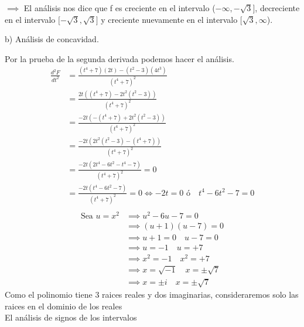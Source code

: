 $\implies$ El análisis nos dice que f es creciente en el intervalo ($-\infty,-\sqrt{3}\big]$, decreciente en el intervalo $[-\sqrt{3},\sqrt{3}\big]$ y creciente nuevamente en el intervalo $[\sqrt{3},\infty$).

				b) Análisis de concavidad.

				Por la prueba de la segunda derivada podemos hacer el análisis.
				\begin{align*}
					\frac{d^2F}{dt^2} & =\frac{(t^4+7)(2t)-(t^2-3)(4t^3)}{(t^4+7)^2}                                   \\
					                  & =\frac{2t((t^4+7)-2t^2(t^2-3))}{(t^4+7)^2}                                     \\
					                  & =\frac{-2t(-(t^4+7)+2t^2(t^2-3))}{(t^4+7)^2}                                   \\
					                  & =\frac{-2t(2t^2(t^2-3)-(t^4+7))}{(t^4+7)^2}                                    \\
					                  & =\frac{-2t(2t^4-6t^2-t^4-7)}{(t^4+7)^2}=0                                      \\
					                  & =\frac{-2t(t^4-6t^2-7)}{(t^4+7)^2}=0 \iff   -2t=0 \text{ ó}\quad t^4-6t^2-7 =0 \\
				\end{align*}
				\begin{align*}
					\text{Sea } u=x^2 & \implies u^2-6u-7=0                     \\
					                  & \implies (u+1)(u-7)=0                   \\
					                  & \implies          u+1=0\quad u-7=0      \\
					                  & \implies u=-1\quad u=+7                 \\
					                  & \implies x^2=-1\quad x^2=+7             \\
					                  & \implies x=\sqrt{-1}\quad x=\pm\sqrt{7} \\
					                  & \implies x=\pm i\quad x=\pm\sqrt{7}
				\end{align*}
				Como el polinomio tiene 3 raices reales y dos imaginarias, consideraremos solo las raices en el dominio de los reales \\
				El análisis de signos de los intervalos
